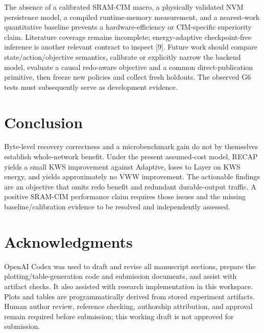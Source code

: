 \documentclass[journal,10pt]{IEEEtran}
\begin{document}
The absence of a calibrated SRAM-CIM macro, a physically validated NVM persistence model, a compiled runtime-memory measurement, and a nearest-work quantitative baseline prevents a hardware-efficiency or CIM-specific superiority claim. Literature coverage remains incomplete; energy-adaptive checkpoint-free inference is another relevant contract to inspect [9]. Future work should compare state/action/objective semantics, calibrate or explicitly narrow the backend model, evaluate a causal redo-aware objective and a common direct-publication primitive, then freeze new policies and collect fresh holdouts. The observed G6 tests must subsequently serve as development evidence.

\section{Conclusion}
Byte-level recovery correctness and a microbenchmark gain do not by themselves establish whole-network benefit. Under the present assumed-cost model, RECAP yields a small KWS improvement against Adaptive, loses to Layer on KWS energy, and yields approximately no VWW improvement. The actionable findings are an objective that omits redo benefit and redundant durable-output traffic. A positive SRAM-CIM performance claim requires those issues and the missing baseline/calibration evidence to be resolved and independently assessed.

\section*{Acknowledgments}
OpenAI Codex was used to draft and revise all manuscript sections, prepare the plotting/table-generation code and submission documents, and assist with artifact checks. It also assisted with research implementation in this workspace. Plots and tables are programmatically derived from stored experiment artifacts. Human author review, reference checking, authorship attribution, and approval remain required before submission; this working draft is not approved for submission.
\end{document}
